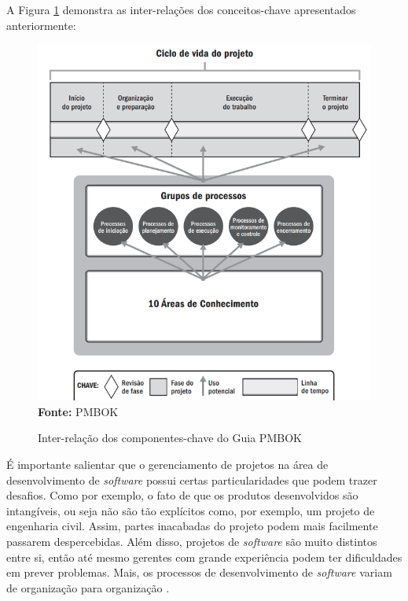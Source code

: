 \documentclass[
    12pt,       %
    openright,      %
    twoside,      %
    a4paper,      %
    english,      %
    french,       %
    spanish,      %
    brazil,       %
    ]{abntex2}
\begin{document}
A Figura \ref{interrelacaoConceitos} demonstra as inter-relações dos conceitos-chave apresentados anteriormente:

\begin{figure}[h]
    \centering
    \caption{Inter-relação dos componentes-chave do Guia PMBOK}
    \includegraphics[scale=0.47]{src/tex/img/interrelacaoPMBOKpg18.png} \\
    \label{interrelacaoConceitos}
    \textbf{Fonte:} PMBOK \cite{PMBOK:2017}
    \centering
\end{figure}

É importante salientar que o gerenciamento de projetos na área de desenvolvimento de \textit{software} possui certas particularidades que podem trazer desafios. Como por exemplo, o fato de que os produtos desenvolvidos são intangíveis, ou seja não são tão explícitos como, por exemplo, um projeto de engenharia civil. Assim, partes inacabadas do projeto podem mais facilmente passarem despercebidas. Além disso, projetos de \textit{software} são muito distintos entre si, então até mesmo gerentes com grande experiência podem ter dificuldades em prever problemas. Mais, os processos de desenvolvimento de \textit{software} variam de organização para organização \cite{SOMMERVILLE:2011}.
\end{document}
